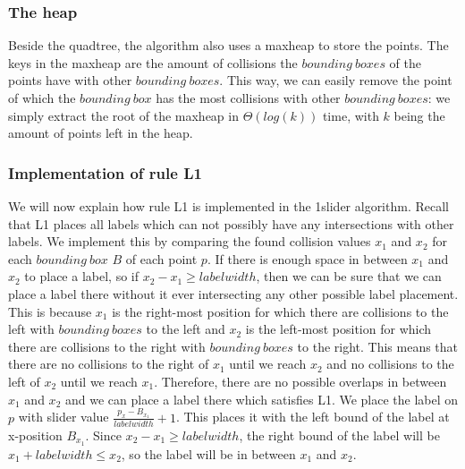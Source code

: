 \documentclass[crop=false,a4paper,oneside,11pt]{article}
\begin{document}
\subsubsection{The heap}
Beside the quadtree, the algorithm also uses a maxheap to store the points. The keys in the maxheap are the amount of collisions the $bounding \ boxes$ of the points have with other $bounding \ boxes$. This way, we can easily remove the point of which the $bounding \ box$ has the most collisions with other $bounding \ boxes$: we simply extract the root of the maxheap in $\Theta(log (k))$ time, with $k$ being the amount of points left in the heap. 

\subsubsection{Implementation of rule L1}
We will now explain how rule L1 is implemented in the 1slider algorithm. Recall that L1 places all labels which can not possibly have any intersections with other labels. We implement this by comparing the found collision values $x_1$ and $x_2$ for each $bounding \ box$ $B$ of each point $p$. If there is enough space in between $x_1$ and $x_2$ to place a label, so if $x_2 - x_1 \geq labelwidth$, then we can be sure that we can place a label there without it ever intersecting any other possible label placement. This is because $x_1$ is the right-most position for which there are collisions to the left with $bounding \ boxes$ to the left and $x_2$ is the left-most position for which there are collisions to the right with $bounding \ boxes$ to the right. This means that there are no collisions to the right of $x_1$ until we reach $x_2$ and no collisions to the left of $x_2$ until we reach $x_1$. Therefore, there are no possible overlaps in between $x_1$ and $x_2$ and we can place a label there which satisfies L1. We place the label on $p$ with slider value $\frac{p_x - B_{x_1}}{labelwidth} + 1$. This places it with the left bound of the label at x-position $B_{x_1}$. Since $x_2 - x_1 \geq labelwidth$, the right bound of the label will be $x_1 + labelwidth \leq x_2$, so the label will be in between $x_1$ and $x_2$.
\end{document}
